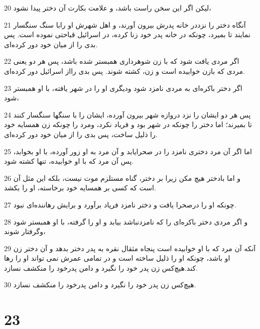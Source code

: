 \par 20 لیکن اگر این سخن راست باشد، و علامت بکارت آن دختر پیدا نشود،
\par 21 آنگاه دختر را نزددر خانه پدرش بیرون آورند، و اهل شهرش او رابا سنگ سنگسار نمایند تا بمیرد، چونکه در خانه پدر خود زنا کرده، در اسرائیل قباحتی نموده است. پس بدی را از میان خود دور کرده‌ای.
\par 22 اگر مردی یافت شود که با زن شوهرداری همبستر شده باشد، پس هر دو یعنی مردی که بازن خوابیده است و زن، کشته شوند. پس بدی رااز اسرائیل دور کرده‌ای.
\par 23 اگر دختر باکره‌ای به مردی نامزد شود ودیگری او را در شهر یافته، با او همبستر شود،
\par 24 پس هر دو ایشان را نزد دروازه شهر بیرون آورده، ایشان را با سنگها سنگسار کنند تا بمیرند؛ اما دختر را چونکه در شهر بود و فریاد نکرد، ومرد را چونکه زن همسایه خود را ذلیل ساخت، پس بدی را از میان خود دور کرده‌ای.
\par 25 اما اگر آن مرد دختری نامزد را در صحرایابد و آن مرد به او زور آورده، با او بخوابد، پس آن مرد که با او خوابیده، تنها کشته شود.
\par 26 و اما بادختر هیچ مکن زیرا بر دختر، گناه مستلزم موت نیست، بلکه این مثل آن است که کسی بر همسایه خود برخاسته، او را بکشد.
\par 27 چونکه او را درصحرا یافت و دختر نامزد فریاد برآورد و برایش رهاننده‌ای نبود.
\par 28 و اگر مردی دختر باکره‌ای را که نامزدنباشد بیابد و او را گرفته، با او همبستر شود وگرفتار شوند،
\par 29 آنکه آن مرد که با او خوابیده است پنجاه مثقال نقره به پدر دختر بدهد و آن دختر زن او باشد، چونکه او را ذلیل ساخته است و در تمامی عمرش نمی تواند او را رها کند.هیچ‌کس زن پدر خود را نگیرد و دامن پدرخود را منکشف نسازد.
\par 30 هیچ‌کس زن پدر خود را نگیرد و دامن پدرخود را منکشف نسازد.
 
\chapter{23}

